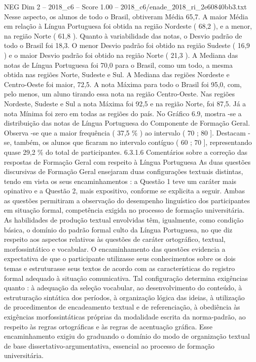 \begin{textsample}{NEG Dim 2 – 2018\_c6 – Score 1.00 – 2018\_c6/enade\_2018\_ri\_2e60840bb3.txt}
Nesse aspecto, os alunos de todo o Brasil, obtiveram Média 65,7.
A maior Média em relação à Língua Portuguesa foi obtida na região Nordeste ( 68,2 ), e a menor, na região Norte ( 61,8 ).
Quanto à variabilidade das notas, o Desvio padrão de todo o Brasil foi 18,3.
O menor Desvio padrão foi obtido na região Sudeste ( 16,9 ) e o maior Desvio padrão foi obtido na região Norte ( 21,3 ).
A Mediana das notas de Língua Portuguesa foi 70,0 para o Brasil, como um todo, a mesma obtida nas regiões Norte, Sudeste e Sul.
A Mediana das regiões Nordeste e Centro-Oeste foi maior, 72,5.
A nota Máxima para todo o Brasil foi 95,0, com, pelo menos, um aluno tirando essa nota na região Centro-Oeste.
Nas regiões Nordeste, Sudeste e Sul a nota Máxima foi 92,5 e na região Norte, foi 87,5.
Já a nota Mínima foi zero em todas as regiões do país.
No Gráfico 6.9, mostra -se a distribuição das notas de Língua Portuguesa do Componente de Formação Geral.
Observa -se que a maior frequência ( 37,5 \% ) ao intervalo ( 70 ; 80 ].
Destacam -se, também, os alunos que ficaram no intervalo contíguo ( 60 ; 70 ], representando quase 29,2 \% do total de participantes. 6.3.1.6 Comentários sobre a correção das respostas de Formação Geral com respeito à Língua Portuguesa As duas questões discursivas de Formação Geral ensejaram duas configurações textuais distintas, tendo em vista os seus encaminhamentos : a Questão 1 teve um caráter mais opinativo e a Questão 2, mais expositivo, conforme se explicita a seguir.
Ambas as questões permitiram a observação do desempenho linguístico dos participantes em situação formal, competência exigida no processo de formação universitária.
As habilidades de produção textual envolvidas têm, igualmente, como condição básica, o domínio do padrão formal culto da Língua Portuguesa, no que diz respeito aos aspectos relativos às questões de caráter ortográfico, textual, morfossintático e vocabular.
O encaminhamento das questões evidencia a expectativa de que o participante utilizasse seus conhecimentos sobre os dois temas e estruturasse seus textos de acordo com as características do registro formal adequado à situação comunicativa.
Tal configuração determina exigências quanto : à adequação da seleção vocabular, ao desenvolvimento do conteúdo, à estruturação sintática dos períodos, à organização lógica das ideias, à utilização de procedimentos de encadeamento textual e de referenciação, à obediência às exigências morfossintáticas próprias da modalidade escrita da norma-padrão, ao respeito às regras ortográficas e às regras de acentuação gráfica.
Esse encaminhamento exigiu do graduando o domínio do modo de organização textual de base dissertativo-argumentativa, essencial ao processo de formação universitária.

\end{textsample}
